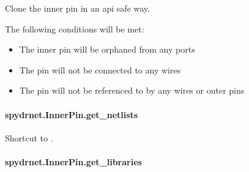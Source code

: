 \documentclass[letterpaper,10pt,english,openany,oneside]{sphinxmanual}
\begin{document}
\begin{fulllineitems}
\label{\detokenize{reference/classes/generated/spydrnet.InnerPin.clone:spydrnet.InnerPin.clone}}
Clone the inner pin in an api safe way.

The following conditions will be met:
\begin{itemize}
\item {} 
The inner pin will be orphaned from any ports

\item {} 
The pin will not be connected to any wires

\item {} 
The pin will not be referenced to by any wires or outer pins

\end{itemize}

\end{fulllineitems}



\paragraph{spydrnet.InnerPin.get\_netlists}
\label{\detokenize{reference/classes/generated/spydrnet.InnerPin.get_netlists:spydrnet-innerpin-get-netlists}}\label{\detokenize{reference/classes/generated/spydrnet.InnerPin.get_netlists::doc}}

\begin{fulllineitems}
\label{\detokenize{reference/classes/generated/spydrnet.InnerPin.get_netlists:spydrnet.InnerPin.get_netlists}}
Shortcut to {\hyperref[\detokenize{reference/classes/generated/spydrnet.get_netlists:spydrnet.get_netlists}]{}}.

\end{fulllineitems}



\paragraph{spydrnet.InnerPin.get\_libraries}
\label{\detokenize{reference/classes/generated/spydrnet.InnerPin.get_libraries:spydrnet-innerpin-get-libraries}}\label{\detokenize{reference/classes/generated/spydrnet.InnerPin.get_libraries::doc}}
\end{document}
